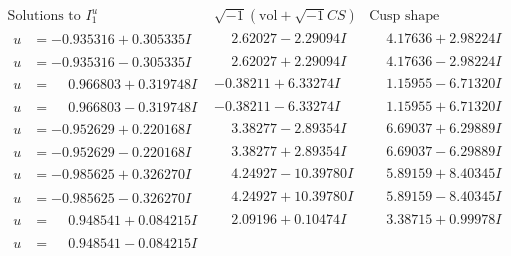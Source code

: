 \documentclass[1p]{elsarticle_modified}
\theoremstyle{definition}
\newcommand{\I}{\sqrt{-1}}
\begin{document}
$$\begin{array}{c|c|c}  
\text{Solutions to }I^u_{1}& \I (\text{vol} + \sqrt{-1}CS) & \text{Cusp shape}\\
 \hline 
\begin{aligned}
u &= -0.935316 + 0.305335 I\end{aligned}
 & \phantom{-}2.62027 - 2.29094 I & \phantom{-}4.17636 + 2.98224 I \\ \hline\begin{aligned}
u &= -0.935316 - 0.305335 I\end{aligned}
 & \phantom{-}2.62027 + 2.29094 I & \phantom{-}4.17636 - 2.98224 I \\ \hline\begin{aligned}
u &= \phantom{-}0.966803 + 0.319748 I\end{aligned}
 & -0.38211 + 6.33274 I & \phantom{-}1.15955 - 6.71320 I \\ \hline\begin{aligned}
u &= \phantom{-}0.966803 - 0.319748 I\end{aligned}
 & -0.38211 - 6.33274 I & \phantom{-}1.15955 + 6.71320 I \\ \hline\begin{aligned}
u &= -0.952629 + 0.220168 I\end{aligned}
 & \phantom{-}3.38277 - 2.89354 I & \phantom{-}6.69037 + 6.29889 I \\ \hline\begin{aligned}
u &= -0.952629 - 0.220168 I\end{aligned}
 & \phantom{-}3.38277 + 2.89354 I & \phantom{-}6.69037 - 6.29889 I \\ \hline\begin{aligned}
u &= -0.985625 + 0.326270 I\end{aligned}
 & \phantom{-}4.24927 - 10.39780 I & \phantom{-}5.89159 + 8.40345 I \\ \hline\begin{aligned}
u &= -0.985625 - 0.326270 I\end{aligned}
 & \phantom{-}4.24927 + 10.39780 I & \phantom{-}5.89159 - 8.40345 I \\ \hline\begin{aligned}
u &= \phantom{-}0.948541 + 0.084215 I\end{aligned}
 & \phantom{-}2.09196 + 0.10474 I & \phantom{-}3.38715 + 0.99978 I \\ \hline\begin{aligned}
u &= \phantom{-}0.948541 - 0.084215 I\end{aligned}

\end{array}$$
\end{document}
